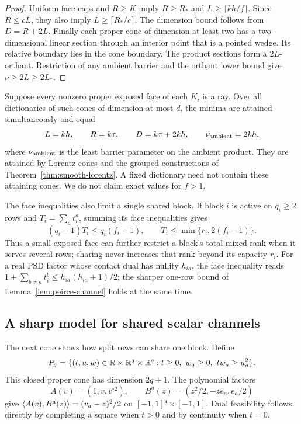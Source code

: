 \begin{proof}
Uniform face caps and $R\geq K$ imply $R\geq R_*$ and
$L\geq\lceil kh/f\rceil$. Since $R\leq cL$, they also imply
$L\geq\lceil R_*/c\rceil$. The dimension bound follows from
$D=R+2L$. Finally each proper cone of dimension at least two
has a two-dimensional linear section through an interior point that
is a pointed wedge. Its relative boundary lies in the cone boundary.
The product sections form a $2L$-orthant. Restriction of any ambient
barrier and the orthant lower bound give $\nu\geq2L\geq2L_*$.
\end{proof}

\begin{corollary}\label{cor:ray-exposed-frontier}
Suppose every nonzero proper exposed face of each $K_i$ is a ray.
Over all dictionaries of such cones of dimension at most $d$, the minima
are attained simultaneously and equal
\[
 L=kh,\qquad R=k\tau,\qquad D=k\tau+2kh,
 \qquad \nu_{\rm ambient}=2kh,
\]
where $\nu_{\rm ambient}$ is the least barrier parameter on the
ambient product. They are attained by Lorentz cones and the grouped constructions of
Theorem~\ref{thm:smooth-lorentz}. A fixed dictionary need not contain
these attaining cones. We do not claim exact values for $f>1$.
\end{corollary}

The face inequalities also limit a single shared block. If block $i$ is
active on $q_i\geq2$
rows and $T_i=\sum_at_i^a$, summing its face inequalities gives
\begin{equation}\label{eq:face-sharing-tradeoff}
 (q_i-1)T_i\leq q_i(f_i-1),\qquad
 T_i\leq\min\{r_i,2(f_i-1)\}.
\end{equation}
Thus a small exposed face can further restrict a block's total mixed
rank when it serves several rows; sharing never increases that rank
beyond its capacity $r_i$. For a real PSD factor whose contact dual
has nullity $h_{ia}$, the face inequality reads
$1+\sum_{b\ne a}t_i^b\leq h_{ia}(h_{ia}+1)/2$; the sharper one-row
bound of Lemma~\ref{lem:peirce-channel} holds at the same time.

\subsection{A sharp model for shared scalar channels}
The next cone shows how split rows can share one block. Define
\[
 P_q=\{(t,u,w)\in\mathbb R\times\mathbb R^q\times\mathbb R^q:
             t\geq0,\ w_a\geq0,\ tw_a\geq u_a^2\}.
\]
This closed proper cone has dimension $2q+1$. The polynomial factors
\begin{equation}\label{eq:shared-square-model}
 A(v)=(1,v,v^{\circ2}),\qquad
 B^a(z)=(z^2/2,-ze_a,e_a/2)
\end{equation}
give $\langle A(v),B^a(z)\rangle=(v_a-z)^2/2$ on $[-1,1]^q\times[-1,1]$.
Dual feasibility follows directly by completing a square when $t>0$
and by continuity when $t=0$.

